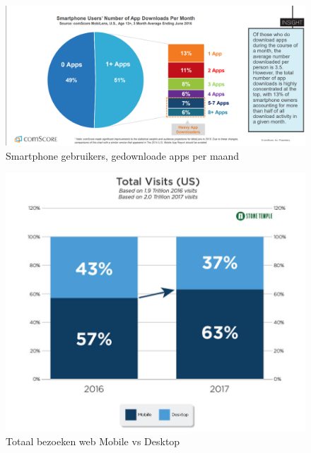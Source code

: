 \documentclass[fleqn,a4paper,12pt]{book}
\begin{document}
\begin{figure}
	\includegraphics[scale=0.75]{img/downloads.png}
	\caption{Smartphone gebruikers, gedownloade apps per maand}
	\label{fig:downloads}
\end{figure}

\begin{figure}
	\includegraphics[scale=0.5]{img/visitsWeb.png}
	\caption{Totaal bezoeken web Mobile vs Desktop}
	\label{fig:visitsWeb}
\end{figure}
\end{document}
